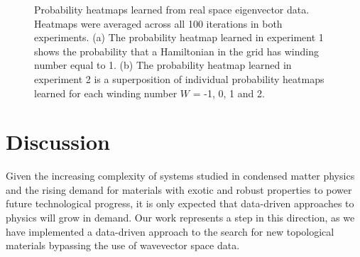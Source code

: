 \documentclass[fleqn,10pt]{wlscirep}
\begin{document}
\begin{figure}
\centering
{}
\caption{Probability heatmaps learned from real space eigenvector data. Heatmaps were averaged across all 100 iterations in both experiments. (a) The probability heatmap learned in experiment 1 shows the probability that a Hamiltonian in the grid has winding number equal to 1.  (b) The probability heatmap learned in experiment 2 is a superposition of individual probability heatmaps learned for each winding number $W$ = -1, 0, 1 and 2.}
\label{heatmaps}
\end{figure}

\section*{Discussion}

Given the increasing complexity of systems studied in condensed matter physics and the rising demand for materials with exotic and robust properties to power future technological progress, it is only expected that data-driven approaches to physics will grow in demand. Our work represents a step in this direction, as we have implemented a data-driven approach to the search for new topological materials bypassing the use of wavevector space data.
\end{document}
